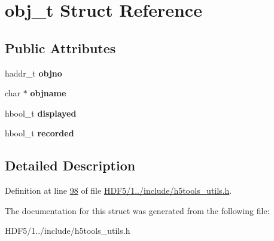 \hypertarget{structobj__t}{}\section{obj\+\_\+t Struct Reference}
\label{structobj__t}
\subsection*{Public Attributes}
\begin{DoxyCompactItemize}
\item 
\mbox{\label{structobj__t_a0b571cbe0b40b1456ed8169fae5c04b8}} 
haddr\+\_\+t {\bfseries objno}
\item 
\mbox{\label{structobj__t_a3fdc540b4c0e644042885203a94e1d05}} 
char $\ast$ {\bfseries objname}
\item 
\mbox{\label{structobj__t_a8897fa0ce7ecffa844c9bd90af662f21}} 
hbool\+\_\+t {\bfseries displayed}
\item 
\mbox{\label{structobj__t_a582143f94f2e48aaa421926edf382750}} 
hbool\+\_\+t {\bfseries recorded}
\end{DoxyCompactItemize}


\subsection{Detailed Description}


Definition at line \hyperlink{_h_d_f5_21_810_81_2include_2h5tools__utils_8h_source_l00098}{98} of file \hyperlink{_h_d_f5_21_810_81_2include_2h5tools__utils_8h_source}{H\+D\+F5/1../include/h5tools\+\_\+utils.\+h}.



The documentation for this struct was generated from the following file\+:\begin{DoxyCompactItemize}
\item 
H\+D\+F5/1../include/h5tools\+\_\+utils.\+h\end{DoxyCompactItemize}
